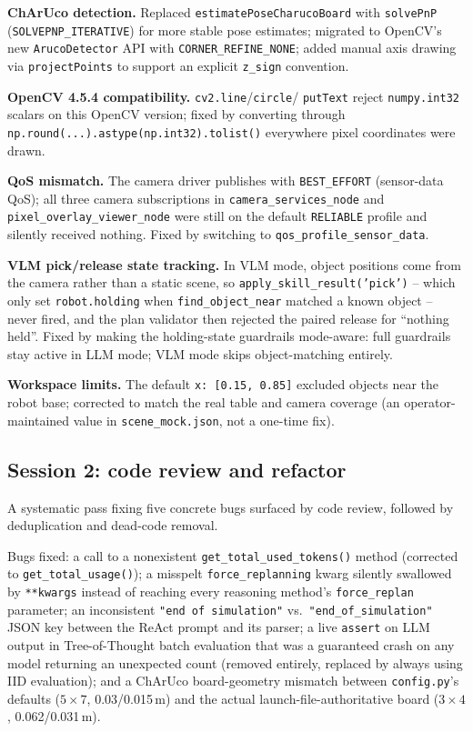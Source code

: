 \textbf{ChArUco detection.} Replaced \texttt{estimatePoseCharucoBoard} with
\texttt{solvePnP} (\texttt{SOLVEPNP\_ITERATIVE}) for more stable pose
estimates; migrated to OpenCV's new \texttt{ArucoDetector} API with
\texttt{CORNER\_REFINE\_NONE}; added manual axis drawing via
\texttt{projectPoints} to support an explicit \texttt{z\_sign} convention.

\textbf{OpenCV 4.5.4 compatibility.} \texttt{cv2.line}/\texttt{circle}/
\texttt{putText} reject \texttt{numpy.int32} scalars on this OpenCV version;
fixed by converting through \texttt{np.round(...).astype(np.int32).tolist()}
everywhere pixel coordinates were drawn.

\textbf{QoS mismatch.} The camera driver publishes with \texttt{BEST\_EFFORT}
(sensor-data QoS); all three camera subscriptions in
\texttt{camera\_services\_node} and \texttt{pixel\_overlay\_viewer\_node} were
still on the default \texttt{RELIABLE} profile and silently received nothing.
Fixed by switching to \texttt{qos\_profile\_sensor\_data}.

\textbf{VLM pick/release state tracking.} In VLM mode, object positions come
from the camera rather than a static scene, so
\texttt{apply\_skill\_result('pick')} -- which only set \texttt{robot.holding}
when \texttt{find\_object\_near} matched a known object -- never fired, and
the plan validator then rejected the paired release for ``nothing held''.
Fixed by making the holding-state guardrails mode-aware: full guardrails
stay active in LLM mode; VLM mode skips object-matching entirely.

\textbf{Workspace limits.} The default \texttt{x: [0.15, 0.85]} excluded
objects near the robot base; corrected to match the real table and camera
coverage (an operator-maintained value in \texttt{scene\_mock.json}, not a
one-time fix).

\subsection{Session 2: code review and refactor}

A systematic pass fixing five concrete bugs surfaced by code review, followed
by deduplication and dead-code removal.

Bugs fixed: a call to a nonexistent \texttt{get\_total\_used\_tokens()}
method (corrected to \texttt{get\_total\_usage()}); a misspelt
\texttt{force\_replanning} kwarg silently swallowed by \texttt{**kwargs}
instead of reaching every reasoning method's \texttt{force\_replan} parameter;
an inconsistent \texttt{"end of simulation"} vs.\ \texttt{"end\_of\_simulation"}
JSON key between the ReAct prompt and its parser; a live \texttt{assert} on
LLM output in Tree-of-Thought batch evaluation that was a guaranteed crash on
any model returning an unexpected count (removed entirely, replaced by
always using IID evaluation); and a ChArUco board-geometry mismatch between
\texttt{config.py}'s defaults ($5\times7$, 0.03/0.015\,m) and the actual
launch-file-authoritative board ($3\times4$, 0.062/0.031\,m).

